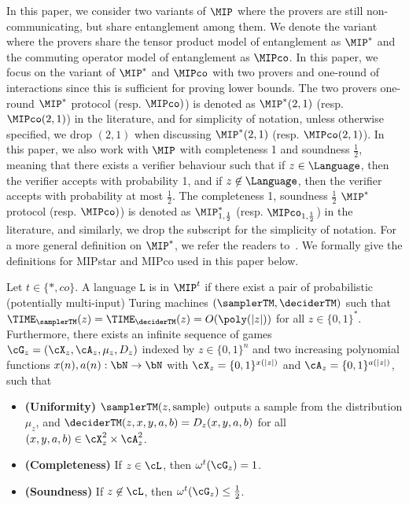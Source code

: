 In this paper, we consider two variants of $\MIP$ where the provers are still non-communicating, but share entanglement among them. We denote the variant where the provers share the tensor product model of entanglement as $\MIP^*$ and the commuting operator model of entanglement as $\MIPco$. In this paper, we focus on the variant of $\MIP^*$ and $\MIPco$ with two provers and one-round of interactions since this is sufficient for proving lower bounds. The two provers one-round $\MIP^*$ protocol (resp. $\MIPco)$) is denoted as $\MIP^*(2,1)$ (resp. $\MIPco(2,1)$) in the literature, and for simplicity of notation, unless otherwise specified, we drop $(2,1)$ when discussing $\MIP^*(2,1)$ (resp. $\MIPco(2,1)$). In this paper, we also work with $\MIP$ with completeness 1 and soundness $\frac{1}{2}$, meaning that there exists a verifier behaviour such that if $z \in \Language$, then the verifier accepts with probability 1, and if $z \not\in \Language$, then the verifier accepts with probability at most $\frac{1}{2}$. The completeness 1, soundness $\frac{1}{2}$ $\MIP^*$ protocol (resp. $\MIPco)$) is denoted as $\MIP^*_{1, \frac{1}{2}}$ (resp. $\MIPco_{1, \frac{1}{2}}$) in the literature, and similarly, we drop the subscript for the simplicity of notation. For a more general definition on $\MIP^*$, we refer the readers to~\cite[Section 6.1]{vidickQuantumProofs2016}. We formally give the definitions for \gls{MIPstar} and \gls{MIPco} used in this paper below. 
\begin{definition}  \label{def:MIPdef}
	Let $t \in \{*, co\}$. A language $\mathtt{L}$ is in $\MIP^t$ if there exist a pair of probabilistic (potentially multi-input) Turing machines $(\samplerTM, \deciderTM)$ such that $\TIME_{\samplerTM}(z) = \TIME_{\deciderTM}(z)  = O(\poly(|z|))$ for all $z \in \{0,1\}^*$. Furthermore, there exists an infinite sequence of games $\cG_{z} = (\cX_z, \cA_z, \mu_z, D_z)$ indexed by $z \in \{0,1\}^n$ and two increasing polynomial functions $x(n), a(n): \bN \rightarrow \bN$ with $\cX_z = \{0,1\}^{x(|z|)}$ and $\cA_z = \{0,1\}^{a(|z|)}$, such that
	\begin{itemize}
		\item \textbf{(Uniformity)} $\samplerTM(z, \text{sample})$ outputs a sample from the distribution $\mu_z$, and $\deciderTM(z, x, y, a, b) = D_z(x,y,a,b)$ for all $(x,y,a,b) \in \cX_z^2 \times \cA_z^2$.  
		\item \textbf{(Completeness)} If $z \in \cL$, then $\omega^t(\cG_z) = 1$. 
		\item \textbf{(Soundness)} If $z \not\in \cL$, then $\omega^t(\cG_z) \leq \frac{1}{2}$. 
	\end{itemize}
\end{definition}
